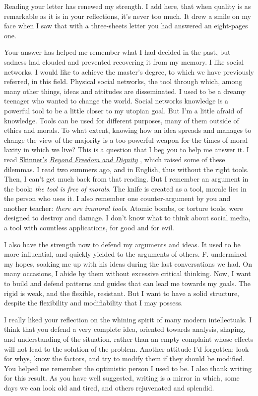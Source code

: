 \documentclass[]{book}
\begin{document}
Reading your letter has renewed my strength. I add here, that when quality is as remarkable as it is in your reflections, it's never too much. It drew a smile on my face when I saw that with a three-sheets letter you had answered an eight-pages one.

Your answer has helped me remember what I had decided in the past, but sadness had clouded and prevented recovering it from my memory. I like social networks. I would like to achieve the master's degree, to which we have previously referred, in this field. Physical social networks, the tool through which, among many other things, ideas and attitudes are disseminated. I used to be a dreamy teenager who wanted to change the world. Social networks knowledge is a powerful tool to be a little closer to my utopian goal. But I'm a little afraid of knowledge. Tools can be used for different purposes, many of them outside of ethics and morals. To what extent, knowing how an idea spreads and manages to change the view of the majority is a too powerful weapon for the times of moral laxity in which we live? This is a question that I beg you to help me answer it. I read \href{https://en.wikipedia.org/wiki/B._F._Skinner}{Skinner's} \href{https://en.wikipedia.org/wiki/Beyond_Freedom_and_Dignity}{\emph{Beyond Freedom and Dignity}} \citep{skinner2002beyond}, which raised some of these dilemmas. I read two summers ago, and in English, thus without the right tools. Then, I can't get much back from that reading. But I remember an argument in the book: \emph{the tool is free of morals}. The knife is created as a tool, morale lies in the person who uses it. I also remember one counter-argument by you and another teacher: \emph{there are immoral tools}. Atomic bombs, or torture tools, were designed to destroy and damage. I don't know what to think about social media, a tool with countless applications, for good and for evil.

I also have the strength now to defend my arguments and ideas. It used to be more influential, and quickly yielded to the arguments of others. F. undermined my hopes, soaking me up with his ideas during the last conversations we had. On many occasions, I abide by them without excessive critical thinking. Now, I want to build and defend patterns and guides that can lead me towards my goals. The rigid is weak, and the flexible, resistant. But I want to have a solid structure, despite the flexibility and modifiability that I may possess.

I really liked your reflection on the whining spirit of many modern intellectuals. I think that you defend a very complete idea, oriented towards analysis, shaping, and understanding of the situation, rather than an empty complaint whose effects will not lead to the solution of the problem. Another attitude I'd forgotten: look for whys, know the factors, and try to modify them if they should be modified. You helped me remember the optimistic person I used to be. I also thank writing for this result. As you have well suggested, writing is a mirror in which, some days we can look old and tired, and others rejuvenated and splendid.
\end{document}
